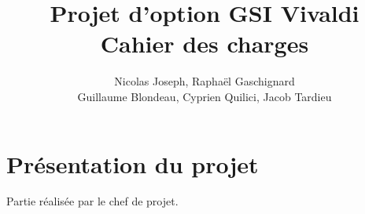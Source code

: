 \documentclass[10pt,a4paper]{article}
\title{Projet d'option GSI Vivaldi \\ Cahier des charges}
\author{Nicolas Joseph, Raphaël Gaschignard\\ Guillaume Blondeau, Cyprien Quilici, Jacob Tardieu}
\begin{document}
\maketitle
\section{Présentation du projet}
Partie réalisée par le chef de projet.
\end{document}
